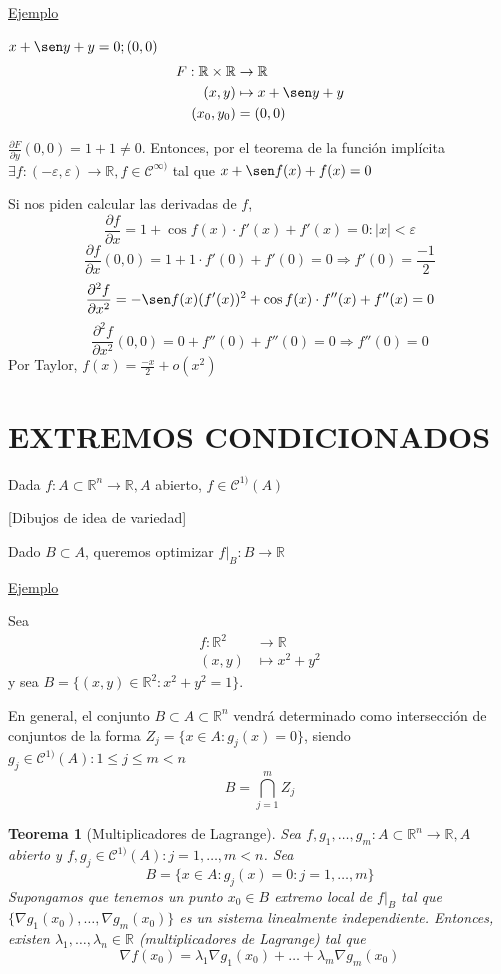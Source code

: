 \documentclass[10pt,a4paper,openright]{book}
\theoremstyle{break}
\newtheorem*{theo}{Teorema}
\begin{document}
\underline{Ejemplo}

$x + \sen y + y = 0; (0,0)$
\begin{align*}
F: \mathbb{R} \times  \mathbb{R} &\to \mathbb{R} \\ (x,y) &\mapsto x + \sen y + y \\ (x_0, y_0) &= (0,0)
\end{align*}

$\frac{\partial F}{\partial y} (0,0) = 1+ 1 \neq 0$. Entonces, por el teorema de la función implícita $\exists f : (-\varepsilon, \varepsilon) \to \mathbb{R}, f \in \mathcal{C}^{\infty )}$ tal que $x + \sen f(x) + f(x) = 0$

Si nos piden calcular las derivadas de $f$, 
$$\frac{\partial f}{\partial x} = 1 + \cos f(x) \cdot f'(x) + f'(x) = 0 : |x| < \varepsilon$$
$$\frac{\partial f}{\partial x} (0,0) = 1 + 1 \cdot f'(0) + f'(0) = 0 \Rightarrow f'(0) = \frac{-1}{2}$$
$$\frac{\partial^2 f}{\partial x^2} = - \sen f(x) (f'(x))^2 + \cos f(x) \cdot f''(x) + f''(x) = 0$$
$$\frac{\partial^2 f}{\partial x^2} (0,0) = 0 + f''(0) + f''(0) = 0 \Rightarrow f''(0) = 0$$
Por Taylor, $f(x) = \frac{-x}{2} + o(x^2)$

\section*{EXTREMOS CONDICIONADOS}
Dada $f: A \subset \mathbb{R}^n \to \mathbb{R}, A$ abierto, $f \in \mathcal{C}^{1)}(A)$

[Dibujos de idea de variedad]

Dado $B \subset A$, queremos optimizar $f|_B : B \to \mathbb{R}$

\underline{Ejemplo}

Sea \begin{align*}
f : \mathbb{R}^2 &\to \mathbb{R} \\ (x,y) &\mapsto x^2 + y^2
\end{align*}
y sea $B = \{(x,y) \in \mathbb{R}^2 : x^2 + y^2 = 1\}$.

En general, el conjunto $B \subset A  \subset \mathbb{R}^n$ vendrá determinado como intersección de conjuntos de la forma $Z_j = \{x \in A : g_j (x) = 0\}$, siendo $g_j \in \mathcal{C}^{1)} (A) : 1 \leq j \leq m < n$
$$B = \bigcap_{j = 1}^m Z_j$$

\begin{theo}[Multiplicadores de Lagrange]
Sea $f, g_1, \ldots, g_m : A \subset \mathbb{R}^n \to \mathbb{R}, A$ abierto y $f, g_j \in \mathcal{C}^{1)} (A) : j = 1, \ldots, m < n$. Sea 
$$B = \{x \in A: g_j (x) = 0 : j =1, \ldots, m\}$$ 
Supongamos que tenemos un punto $x_0 \in B$ extremo local de $f|_B$ tal que $\{\nabla g_1(x_0), \ldots, \nabla g_m(x_0)\}$ es un sistema linealmente independiente. Entonces, existen $\lambda_1, \ldots, \lambda_n \in \mathbb{R}$ (multiplicadores de Lagrange) tal que 
$$\nabla f(x_0) = \lambda_1 \nabla g_1 (x_0) + \ldots + \lambda_m \nabla g_m (x_0)$$
\end{theo}
\end{document}
